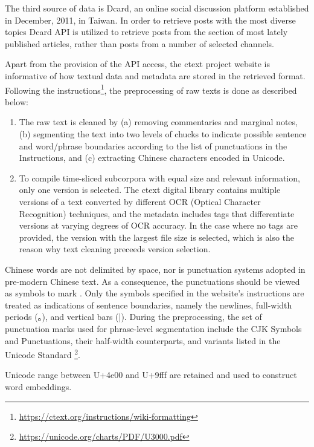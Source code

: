 The third source of data is Dcard, an online social discussion platform established in December, 2011, in Taiwan. In order to retrieve posts with the most diverse topics Dcard API is utilized to retrieve posts from the section of most lately published articles, rather than posts from a number of selected channels.

Apart from the provision of the API access, the \gls{ctext} project website is informative of how textual data and metadata are stored in the retrieved format. Following the instructions\footnote{\url{https://ctext.org/instructions/wiki-formatting}}, the preprocessing of raw texts is done as described below:

\begin{enumerate}[label={(\arabic*)}]
    \item The raw text is cleaned by (a) removing commentaries and marginal notes, (b) segmenting the text into two levels of chucks to indicate possible sentence and word/phrase boundaries according to the list of punctuations in the Instructions, and (c) extracting Chinese characters encoded in Unicode.
    \item To compile time-sliced subcorpora with equal size and relevant information, only one version is selected. The \gls{ctext} digital library contains multiple versions of a text converted by different OCR (Optical Character Recognition) techniques, and the metadata includes tags that differentiate versions at varying degrees of OCR accuracy. In the case where no tags are provided, the version with the largest file size is selected, which is also the reason why text cleaning preceeds version selection.
\end{enumerate} 

Chinese words are not delimited by space, nor is punctuation systems adopted in pre-modern Chinese text. As a consequence, the punctuations  should be viewed as symbols to mark . Only the symbols specified in the website's instructions are treated as indications of sentence boundaries, namely the newlines, full-width periods (。), and vertical bars (|). During the preprocessing, the set of punctuation marks used for phrase-level segmentation include the CJK Symbols and Punctuations, their half-width counterparts, and variants listed in the Unicode Standard \footnote{\url{https://unicode.org/charts/PDF/U3000.pdf}}.

Unicode range between U+4e00 and U+9fff are retained and used to construct word embeddings.

